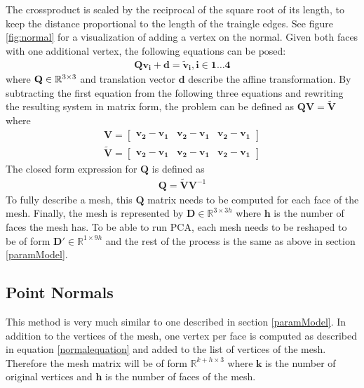 The crossproduct is scaled by the reciprocal of the square root of its length, to keep the distance proportional to the length of the traingle edges. See figure \ref{fig:normal} for a visualization of adding a vertex on the normal.
Given both faces with one additional vertex, the following equations can be posed:
\begin{gather}
 \mathbf{Q}\mathbf{v_i}+\mathbf{d} = \mathbf{\tilde{v}_i}, \mathbf{i} \in \mathbf{1} \dotsc \mathbf{4}
\end{gather}
where $\mathbf{Q} \in \mathbb{R}^{3 \times 3}$ and translation vector $\mathbf{d}$ describe the affine transformation. By subtracting the first equation from the following three equations and rewriting the resulting system in matrix form, the problem can be defined as $\mathbf{Q}\mathbf{V}=\mathbf{\tilde{V}}$ where
\begin{gather}
  \mathbf{V} =
  \begin{bmatrix}
   \mathbf{v_2} - \mathbf{v_1}&\mathbf{v_2} - \mathbf{v_1}&\mathbf{v_2} - \mathbf{v_1}
  \end{bmatrix} \\
  \mathbf{\tilde{V}} =
  \begin{bmatrix}
   \mathbf{\mathbf{v}_2} - \mathbf{\mathbf{v}_1}&\mathbf{\mathbf{v}_2} - \mathbf{\mathbf{v}_1}&\mathbf{\mathbf{v}_2} - \mathbf{\mathbf{v}_1}
  \end{bmatrix}
\end{gather}
The closed form expression for $\mathbf{Q}$ is defined as
\begin{gather}
  \mathbf{Q}=\mathbf{\tilde{V}}\mathbf{V}^{-1}
\end{gather}
To fully describe a mesh, this $\mathbf{Q}$ matrix needs to be computed for each face of the mesh. Finally, the mesh is represented by $\mathbf{D} \in \mathbb{R}^{3 \times 3h}$ where $\mathbf{h}$ is the number of faces the mesh has. To be able to run PCA, each mesh needs to be reshaped to be of form $\mathbf{D'} \in \mathbb{R}^{1 \times 9h}$ and the rest of the process is the same as above in section \ref{paramModel}.

\subsection{Point Normals}
This method is very much similar to one described in section \ref{paramModel}. In addition to the vertices of the mesh, one vertex per face is computed as described in equation \ref{normalequation} and added to the list of vertices of the mesh. Therefore the mesh matrix will be of form $\mathbb{R}^{k+h \times 3}$ where $\mathbf{k}$ is the number of original vertices and $\mathbf{h}$ is the number of faces of the mesh.

